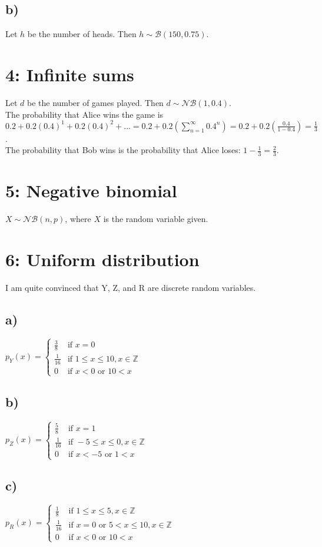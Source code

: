 \documentclass{article}
\begin{document}
\subsection*{b)}
Let $h$ be the number of heads.
Then $h \sim \mathcal{B}(150, 0.75)$.


\section*{4: Infinite sums}
Let $d$ be the number of games played. Then $d \sim \mathcal{NB}(1, 0.4)$.
\\The probability that Alice wins the game is
\\$0.2 + 0.2(0.4)^1 + 0.2(0.4)^2 + ...
= 0.2 + 0.2\left(\displaystyle\sum_{n=1}^\infty 0.4^n\right)
\textstyle
= 0.2 + 0.2(\frac{0.4}{1-0.4})
= \frac{1}{3}$.
\\The probability that Bob wins is the probability that Alice
loses:
$1 - \frac{1}{3} = \frac{2}{3}$.

\section*{5: Negative binomial}
$X \sim \mathcal{NB}(n, p)$, where $X$ is the random variable given.

\section*{6: Uniform distribution}
I am quite convinced that Y, Z, and R are discrete random variables.

\subsection*{a)}
$p_Y(x) = 
\begin{cases}
    \frac{3}{8} & \text{if }x = 0 \\
    \frac{1}{16} & \text{if }1 \leq x \leq 10, x \in \mathbb{Z} \\
    0 & \text{if }x < 0 \text{ or }10 < x
\end{cases}
$

\subsection*{b)}
$p_Z(x) =
\begin{cases}
    \frac{5}{8} & \text{if }x = 1 \\
    \frac{1}{16} & \text{if }-5 \leq x \leq 0, x \in \mathbb{Z} \\
    0 & \text{if }x < -5 \text{ or }1 < x
\end{cases}
$

\subsection*{c)}
$p_R(x) =
\begin{cases}
    \frac{1}{8} & \text{if }1 \leq x \leq 5, x \in \mathbb{Z} \\
    \frac{1}{16} & \text{if }x = 0 \text{ or }
        5 < x \leq 10, x \in \mathbb{Z} \\
    0 & \text{if }x < 0 \text{ or }10 < x
\end{cases}
$
\end{document}
